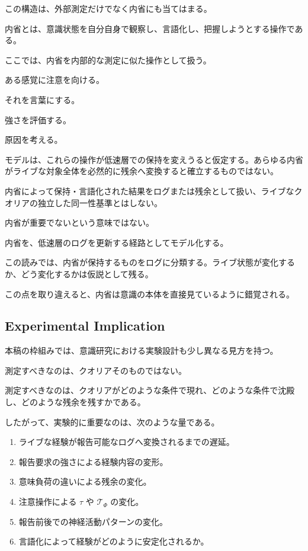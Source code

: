 この構造は、外部測定だけでなく内省にも当てはまる。

内省とは、意識状態を自分自身で観察し、言語化し、把握しようとする操作である。

ここでは、内省を内部的な測定に似た操作として扱う。

ある感覚に注意を向ける。

それを言葉にする。

強さを評価する。

原因を考える。

モデルは、これらの操作が低速層での保持を変えうると仮定する。あらゆる内省がライブな対象全体を必然的に残余へ変換すると確立するものではない。

内省によって保持・言語化された結果をログまたは残余として扱い、ライブなクオリアの独立した同一性基準とはしない。

内省が重要でないという意味ではない。

内省を、低速層のログを更新する経路としてモデル化する。

この読みでは、内省が保持するものをログに分類する。ライブ状態が変化するか、どう変化するかは仮説として残る。

この点を取り違えると、内省は意識の本体を直接見ているように錯覚される。

\subsection{Experimental Implication}

本稿の枠組みでは、意識研究における実験設計も少し異なる見方を持つ。

測定すべきなのは、クオリアそのものではない。

測定すべきなのは、クオリアがどのような条件で現れ、どのような条件で沈殿し、どのような残余を残すかである。

したがって、実験的に重要なのは、次のような量である。

\begin{enumerate}
\item ライブな経験が報告可能なログへ変換されるまでの遅延。
\item 報告要求の強さによる経験内容の変形。
\item 意味負荷の違いによる残余の変化。
\item 注意操作による $\tau$ や $\mathcal{T}_{\Phi}$ の変化。
\item 報告前後での神経活動パターンの変化。
\item 言語化によって経験がどのように安定化されるか。
\end{enumerate}

